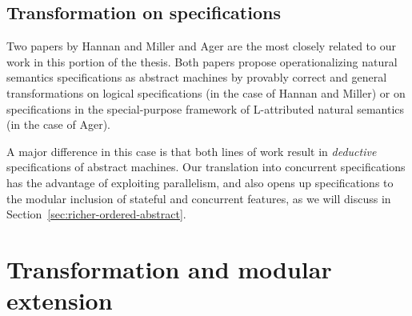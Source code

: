 \subsection*{Transformation on specifications}

Two papers by Hannan and Miller \cite{hannan92operational} and Ager
\cite{ager04natural} are the most closely related to our work in this
portion of the thesis. Both papers propose operationalizing natural
semantics specifications as abstract machines by provably correct and
general transformations on logical specifications (in the case of
Hannan and Miller) or on specifications in the special-purpose
framework of L-attributed natural semantics (in the case of Ager).

A major difference in this case is that both lines of
work result in {\it deductive} specifications of abstract
machines. Our translation into concurrent specifications has the
advantage of exploiting parallelism, and also opens up specifications to
the modular inclusion of stateful and concurrent features, as we will
discuss in Section~\ref{sec:richer-ordered-abstract}.


\section{Transformation and modular extension}
\label{sec:the-point-is-modular-extension}


